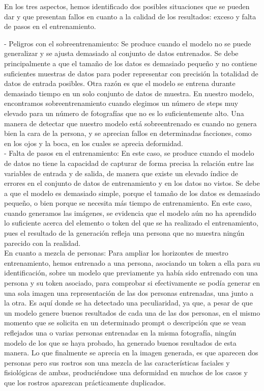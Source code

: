 En los tres aspectos, hemos identificado dos posibles situaciones que se pueden dar y que presentan fallos en cuanto a la calidad de los resultados: exceso y falta de pasos en el entrenamiento. 


- Peligros con el sobreentrenamiento: Se produce cuando el modelo no se puede generalizar y se ajusta demasiado al conjunto de datos entrenados. Se debe principalmente a que el tamaño de los datos es demasiado pequeño y no contiene suficientes muestras de datos para poder representar con precisión la totalidad de datos de entrada posibles. Otra razón es que el modelo se entrena durante demasiado tiempo en un solo conjunto de datos de muestra. En nuestro modelo, encontramos sobreentrenamiento cuando elegimos un número de steps muy elevado para un número de fotografías que no es lo suficientemente alto. Una manera de detectar que nuestro modelo está sobreentrenado es cuando no genera bien la cara de la persona, y se aprecian fallos en determinadas facciones, como en los ojos y la boca, en los cuales se aprecia deformidad.\\

- Falta de pasos en el entrenamiento: En este caso, se produce cuando el modelo de datos no tiene la capacidad de capturar de forma precisa la relación entre las variables de entrada y de salida, de manera que existe un elevado índice de errores en el conjunto de datos de entrenamiento y en los datos no vistos. Se debe a que el modelo es demasiado simple, porque el tamaño de los datos es demasiado pequeño, o bien porque se necesita más tiempo de entrenamiento. En este caso, cuando generamos las imágenes, se evidencia que el modelo aún no ha aprendido lo suficiente acerca del elemento o token del que se ha realizado el entrenamiento, pues el resultado de la generación refleja una persona que no muestra ningún parecido con la realidad.\\


En cuanto a mezcla de personas: Para ampliar los horizontes de nuestro entrenamiento, hemos entrenado a una persona, asociando un token a ella para su identificación, sobre un modelo que previamente ya había sido entrenado con una persona y su token asociado, para comprobar si efectivamente se podía generar en una sola imagen una representación de las dos personas entrenadas, una junto a la otra. Es aquí donde se ha detectado una peculiaridad, ya que, a pesar de que un modelo genere buenos resultados de cada una de las dos personas, en el mismo momento que se solicita en un determinado prompt o descripción que se vean reflejados una o varias personas entrenadas en la misma fotografía, ningún modelo de los que se haya probado, ha generado buenos resultados de esta manera. Lo que finalmente se aprecia en la imagen generada, es que aparecen dos personas pero sus rostros son una mezcla de las características faciales y fisiológicas de ambas, produciéndose una deformidad en muchos de los casos y que los rostros aparezcan prácticamente duplicados.


